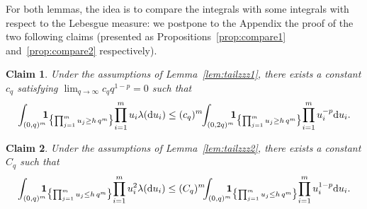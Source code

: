 \documentclass[JEP,XML,SOM,Unicode,published]{cedram}
\newtheorem{claim}{Claim}
\theoremstyle{definition}
\newcommand{\dd}{\mathrm{d}}
\newcommand{\ind}{\mathbf{1}}
\begin{document}
For both lemmas, the idea is to compare the integrals with some integrals with respect to the Lebesgue measure: we postpone to the Appendix the proof of the two following claims (presented as Propositions~\ref{prop:compare1} and~\ref{prop:compare2} respectively).

\begin{claim}
Under the assumptions of Lemma~\ref{lem:tailzzz1},
there exists a constant $c_q$ satisfying
$\lim_{q\to\infty} c_q q^{1-p} =0$ such that
\begin{equation}
\label{plusdidee}
\int_{(0,q)^m}\hspace*{-2mm} \ind_{\bigl\{\prod^m_{j=1}u_j \geq h\, q^m\bigr\}}\! \prod_{i=1}^m u_i \lambda(\dd u_i) \le (c_q)^m\hspace*{-1mm}\int_{(0,2q)^m}\hspace*{-2mm} \ind_{\bigl\{\prod^m_{j=1}u_j \ge h\, q^m\bigr\}}\! \prod_{i=1}^m u_i^{-p} \dd u_i.
\end{equation}
\end{claim}

\begin{claim}
Under the assumptions of Lemma~\ref{lem:tailzzz2},
there exists a constant $C_q$ such that
\begin{equation}
\label{plusdidee2}
\int_{(0,q)^m} \hspace*{-2.5mm}\ind_{\bigl\{\prod^m_{j=1}u_j \le h\, q^m\bigr\}}\! \prod_{i=1}^m u_i^2 \lambda(\dd u_i) \le (C_q)^m\hspace*{-1.5mm}
\int_{(0,q)^m} \hspace*{-2.5mm}\ind_{\bigl\{\prod^m_{j=1} u_j \le h\, q^m\bigr\}}\! \prod_{i=1}^m u_i^{1-p} \dd u_i.
\end{equation}
\end{claim}
\end{document}
